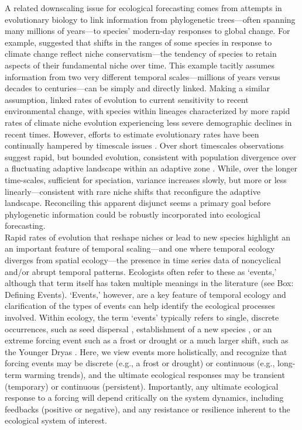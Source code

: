 \documentclass[11pt,a4paper,oneside]{article}
\begin{document}
A related downscaling issue for ecological forecasting comes from attempts in evolutionary biology to link information from phylogenetic trees---often spanning many millions of years---to species' modern-day responses to global change. For example, \citet{Wiens2005} suggested that shifts in the ranges of some species in
response to climate change reflect niche conservatism---the tendency of
species to retain aspects of their fundamental niche over time. This example
tacitly assumes information from two very different temporal 
scales---millions of years versus decades to centuries---can be
simply and directly linked. Making a similar assumption, \citet{lavergne2013} linked
rates of evolution to current sensitivity to recent environmental
change, with species within lineages characterized by more rapid rates of climate
niche evolution experiencing less severe demographic declines in recent times. However, efforts to
estimate evolutionary rates have been continually hampered by timescale issues
\citep{schoener2011,Uyeda2011}. Over short timescales observations
suggest rapid, but bounded evolution, consistent with population
divergence over a fluctuating adaptive landscape within an adaptive zone
\citep{Uyeda2011}. While, over the longer time-scales, sufficient for
speciation, variance increases slowly, but more or less
linearly---consistent with rare niche shifts that reconfigure the
adaptive landscape. Reconciling this apparent disjunct seems a primary
goal before phylogenetic information could be robustly incorporated into
ecological forecasting.\\

Rapid rates of evolution that reshape niches or lead to new species highlight an an important feature of temporal scaling---and one where temporal ecology diverges from spatial ecology---the presence in time series data of noncyclical and/or abrupt temporal patterns. Ecologists often refer to these as `events,' although that term itself has taken multiple meanings in the literature (see Box: Defining Events). `Events,' however, are a key feature of temporal ecology and clarification of the types of events can help identify the ecological processes involved. Within ecology, the term `events' typically refers to single, discrete occurrences, such as seed dispersal \citep{Higgins2003}, establishment of a new species \citep{Blackburn2011}, or an extreme forcing event such as a frost or drought \citep{Jentsch:2009ff} or a much larger shift, such as the Younger Dryas \citep{Jackson:2009el}. Here, we view events more holistically, and recognize that forcing events may be discrete (e.g., a frost or drought) or continuous (e.g., long-term warming trends), and the ultimate ecological responses may be transient (temporary) or continuous (persistent). Importantly, any ultimate ecological response to a forcing will depend critically on the system dynamics, including feedbacks (positive or negative), and any resistance or resilience inherent to the ecological system of interest. \\
\end{document}
